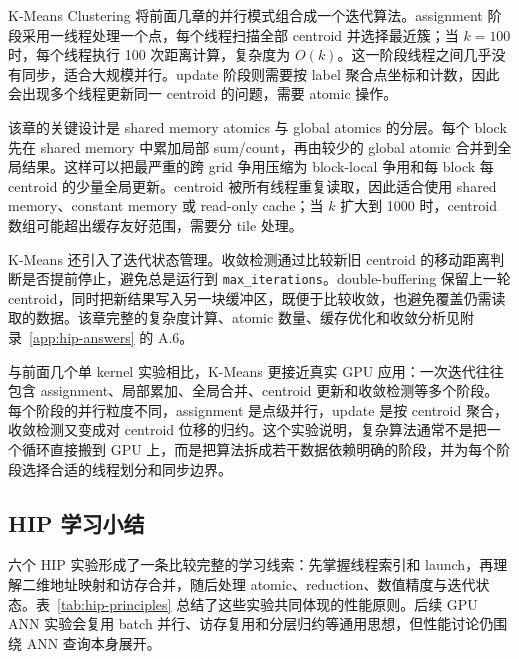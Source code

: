 \documentclass[10pt,a4paper]{article}
\begin{document}
K-Means Clustering 将前面几章的并行模式组合成一个迭代算法。assignment 阶段采用一线程处理一个点，每个线程扫描全部 centroid 并选择最近簇；当 $k=100$ 时，每个线程执行 100 次距离计算，复杂度为 $O(k)$。这一阶段线程之间几乎没有同步，适合大规模并行。update 阶段则需要按 label 聚合点坐标和计数，因此会出现多个线程更新同一 centroid 的问题，需要 atomic 操作。

该章的关键设计是 shared memory atomics 与 global atomics 的分层。每个 block 先在 shared memory 中累加局部 sum/count，再由较少的 global atomic 合并到全局结果。这样可以把最严重的跨 grid 争用压缩为 block-local 争用和每 block 每 centroid 的少量全局更新。centroid 被所有线程重复读取，因此适合使用 shared memory、constant memory 或 read-only cache；当 $k$ 扩大到 1000 时，centroid 数组可能超出缓存友好范围，需要分 tile 处理。

K-Means 还引入了迭代状态管理。收敛检测通过比较新旧 centroid 的移动距离判断是否提前停止，避免总是运行到 \texttt{max\_iterations}。double-buffering 保留上一轮 centroid，同时把新结果写入另一块缓冲区，既便于比较收敛，也避免覆盖仍需读取的数据。该章完整的复杂度计算、atomic 数量、缓存优化和收敛分析见附录~\ref{app:hip-answers} 的 A.6。

与前面几个单 kernel 实验相比，K-Means 更接近真实 GPU 应用：一次迭代往往包含 assignment、局部累加、全局合并、centroid 更新和收敛检测等多个阶段。每个阶段的并行粒度不同，assignment 是点级并行，update 是按 centroid 聚合，收敛检测又变成对 centroid 位移的归约。这个实验说明，复杂算法通常不是把一个循环直接搬到 GPU 上，而是把算法拆成若干数据依赖明确的阶段，并为每个阶段选择合适的线程划分和同步边界。

\subsection{HIP 学习小结}

六个 HIP 实验形成了一条比较完整的学习线索：先掌握线程索引和 launch，再理解二维地址映射和访存合并，随后处理 atomic、reduction、数值精度与迭代状态。表~\ref{tab:hip-principles} 总结了这些实验共同体现的性能原则。后续 GPU ANN 实验会复用 batch 并行、访存复用和分层归约等通用思想，但性能讨论仍围绕 ANN 查询本身展开。
\end{document}
